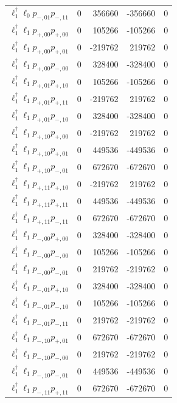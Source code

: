 \begin{longtable}{@{}lrrrr@{}}
$\ell_{1}^\dagger \ell_{0} p_{-,01} p_{-,11}$ & 0 & 356660 & -356660 & 0 \\
$\ell_{1}^\dagger \ell_{1} p_{+,00} p_{+,00}$ & 0 & 105266 & -105266 & 0 \\
$\ell_{1}^\dagger \ell_{1} p_{+,00} p_{+,01}$ & 0 & -219762 & 219762 & 0 \\
$\ell_{1}^\dagger \ell_{1} p_{+,00} p_{-,00}$ & 0 & 328400 & -328400 & 0 \\
$\ell_{1}^\dagger \ell_{1} p_{+,01} p_{+,10}$ & 0 & 105266 & -105266 & 0 \\
$\ell_{1}^\dagger \ell_{1} p_{+,01} p_{+,11}$ & 0 & -219762 & 219762 & 0 \\
$\ell_{1}^\dagger \ell_{1} p_{+,01} p_{-,10}$ & 0 & 328400 & -328400 & 0 \\
$\ell_{1}^\dagger \ell_{1} p_{+,10} p_{+,00}$ & 0 & -219762 & 219762 & 0 \\
$\ell_{1}^\dagger \ell_{1} p_{+,10} p_{+,01}$ & 0 & 449536 & -449536 & 0 \\
$\ell_{1}^\dagger \ell_{1} p_{+,10} p_{-,01}$ & 0 & 672670 & -672670 & 0 \\
$\ell_{1}^\dagger \ell_{1} p_{+,11} p_{+,10}$ & 0 & -219762 & 219762 & 0 \\
$\ell_{1}^\dagger \ell_{1} p_{+,11} p_{+,11}$ & 0 & 449536 & -449536 & 0 \\
$\ell_{1}^\dagger \ell_{1} p_{+,11} p_{-,11}$ & 0 & 672670 & -672670 & 0 \\
$\ell_{1}^\dagger \ell_{1} p_{-,00} p_{+,00}$ & 0 & 328400 & -328400 & 0 \\
$\ell_{1}^\dagger \ell_{1} p_{-,00} p_{-,00}$ & 0 & 105266 & -105266 & 0 \\
$\ell_{1}^\dagger \ell_{1} p_{-,00} p_{-,01}$ & 0 & 219762 & -219762 & 0 \\
$\ell_{1}^\dagger \ell_{1} p_{-,01} p_{+,10}$ & 0 & 328400 & -328400 & 0 \\
$\ell_{1}^\dagger \ell_{1} p_{-,01} p_{-,10}$ & 0 & 105266 & -105266 & 0 \\
$\ell_{1}^\dagger \ell_{1} p_{-,01} p_{-,11}$ & 0 & 219762 & -219762 & 0 \\
$\ell_{1}^\dagger \ell_{1} p_{-,10} p_{+,01}$ & 0 & 672670 & -672670 & 0 \\
$\ell_{1}^\dagger \ell_{1} p_{-,10} p_{-,00}$ & 0 & 219762 & -219762 & 0 \\
$\ell_{1}^\dagger \ell_{1} p_{-,10} p_{-,01}$ & 0 & 449536 & -449536 & 0 \\
$\ell_{1}^\dagger \ell_{1} p_{-,11} p_{+,11}$ & 0 & 672670 & -672670 & 0 \\

\end{longtable}
